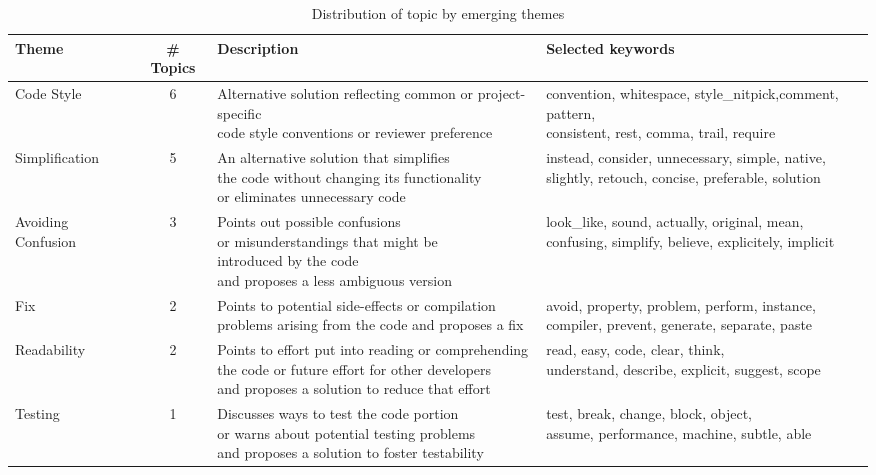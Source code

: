 \begin{table*}
  \caption{Distribution of topic by emerging themes}
  \label{tab:freq}
  \begin{tabular}{lcll}
    \toprule
\textbf{Theme} & \textbf{\# Topics} & \textbf{Description}&\textbf{Selected keywords}\\
\midrule
Code Style & 6 &\makecell[l]{Alternative solution reflecting common or project-specific\\ code style conventions or reviewer preference} & \makecell[l]{convention, whitespace, style\_nitpick,comment, pattern,\\ consistent, rest, comma, trail, require}\\
\hline

Simplification & 5 & \makecell[l]{An alternative solution that simplifies\\ the code without changing its functionality\\ or eliminates unnecessary code}& \makecell[l]{instead, consider, unnecessary, simple, native,\\ slightly, retouch, concise, preferable, solution}\\
\hline

Avoiding Confusion & 3 &\makecell[l]{Points out possible confusions \\ or misunderstandings that might be\\ introduced by the code \\and proposes a less ambiguous version} & \makecell[l]{look\_like, sound, actually, original, mean,\\ confusing, simplify, believe, explicitely, implicit}\\
\hline
Fix & 2 &\makecell[l]{Points to potential side-effects or compilation\\problems arising from the code and proposes a fix}& \makecell[l]{avoid, property, problem, perform, instance,\\ compiler, prevent, generate, separate, paste}\\
\hline
Readability & 2 &\makecell[l]{Points to effort put into reading or comprehending\\ the code or future effort for other developers\\ and proposes a solution to reduce that effort }& \makecell[l]{read, easy, code, clear, think,\\understand, describe, explicit, suggest, scope}\\
\hline
Testing & 1 &\makecell[l]{Discusses ways to test the code portion\\ or warns about potential testing problems\\ and proposes a solution to foster testability}& \makecell[l]{test, break, change, block, object,\\ assume, performance, machine, subtle, able}\\
  \bottomrule
\end{tabular}
\end{table*}